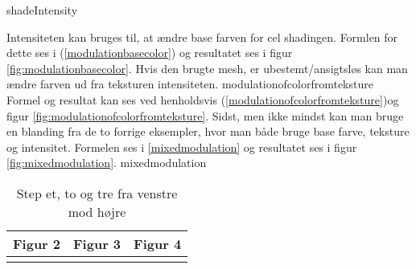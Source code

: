  {shadeIntensity} 

Intensiteten kan bruges til, at ændre base farven for cel shadingen. Formlen for dette ses i
(\ref{modulationbasecolor}) og resultatet ses i figur \ref{fig:modulationbasecolor}. 
Hvis den brugte mesh, er ubestemt/ansigtsløs kan man ændre farven ud fra teksturen
intensiteten.
{modulationofcolorfromteksture}
\\
Formel og resultat kan ses ved henholdsvis
(\ref{modulationofcolorfromteksture})og figur \ref{fig:modulationofcolorfromteksture}. Sidst,
men ikke mindst kan man bruge en blanding fra de to forrige eksempler, hvor man både bruge base
farve, teksture og intensitet. Formelen ses i \ref{mixedmodulation} og resultatet ses i figur
\ref{fig:mixedmodulation}. {mixedmodulation}
\begin{table}[h!]
     \begin{center}
     \begin{tabular}{ | l | l | l | }
     \hline
      \textbf{Figur 2} & \textbf{Figur 3} & \textbf{Figur 4}\\ \hline
     
     &
    
     &
    
   \\ \hline
     
   \end{tabular}
   \caption{Step et, to og tre fra venstre mod højre
   \label{figtbl:modulation}}
   \end{center}
   \end{table}

